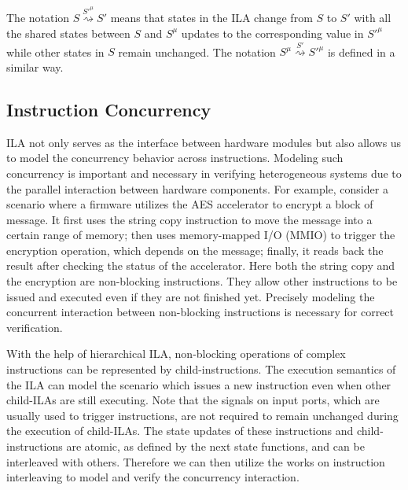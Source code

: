 \documentclass[letterpaper, 11 pt]{article}  %
\begin{document}
The notation $S \overset{S'^\mu}{\rightsquigarrow} S'$ means that states in the 
ILA change from $S$ to $S'$ with all the shared states between $S$ and $S^\mu$
updates to the corresponding value in $S'^\mu$ while other states in $S$ remain 
unchanged.
The notation $S^\mu \overset{S'}{\rightsquigarrow} S'^\mu$ is defined in a 
similar way.

\subsection*{Instruction Concurrency}


ILA not only serves as the interface between hardware modules but 
also allows us to model the concurrency behavior across instructions. 
Modeling such concurrency is important and necessary in verifying heterogeneous 
systems due to the parallel interaction between hardware components.
%
For example, consider a scenario where a firmware utilizes the AES accelerator
to encrypt a block of message. 
It first uses the string copy instruction to move the message into a certain
range of memory; then uses memory-mapped I/O (MMIO) to trigger the encryption
operation, which depends on the message; finally, it reads back the result after
checking the status of the accelerator.
%
Here both the string copy and the encryption are non-blocking instructions. 
They allow other instructions to be issued and executed even if they are not
finished yet.
Precisely modeling the concurrent interaction between non-blocking instructions 
is necessary for correct verification.

With the help of hierarchical ILA, non-blocking operations of complex 
instructions can be represented by child-instructions.
The execution semantics of the ILA can model the scenario which issues a new
instruction even when other child-ILAs are still executing.
%
Note that the signals on input ports, which are usually used to trigger 
instructions, are not required to remain unchanged during the execution of 
child-ILAs.
The state updates of these instructions and child-instructions are atomic, as 
defined by the next state functions, and can be interleaved with others.
%
Therefore we can then utilize the works on instruction interleaving to model
and verify the concurrency interaction.
\end{document}
